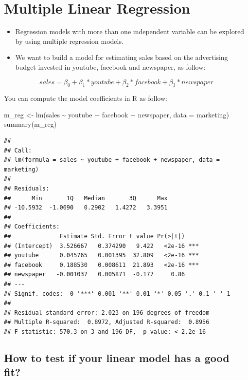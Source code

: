 \documentclass[
]{book}
\newenvironment{Shaded}{\begin{snugshade}}{\end{snugshade}}
\newcommand{\AttributeTok}[1]{\textcolor[rgb]{0.77,0.63,0.00}{#1}}
\newcommand{\FunctionTok}[1]{\textcolor[rgb]{0.00,0.00,0.00}{#1}}
\newcommand{\NormalTok}[1]{#1}
\newcommand{\OtherTok}[1]{\textcolor[rgb]{0.56,0.35,0.01}{#1}}
\newcommand{\SpecialCharTok}[1]{\textcolor[rgb]{0.00,0.00,0.00}{#1}}
\begin{document}
\hypertarget{multiple-linear-regression}{%
\section{Multiple Linear Regression}\label{multiple-linear-regression}}

\begin{itemize}
\item
  Regression models with more than one independent variable can be explored by using multiple regression models.
\item
  We want to build a model for estimating sales based on the advertising budget invested in youtube, facebook and newspaper, as follow:
\end{itemize}

\[sales = \beta_0 + \beta_1*youtube + \beta_2*facebook + \beta_3*newspaper\]

You can compute the model coefficients in R as follow:

\begin{Shaded}
\begin{Highlighting}[]
\NormalTok{m\_reg }\OtherTok{\textless{}{-}} \FunctionTok{lm}\NormalTok{(sales }\SpecialCharTok{\textasciitilde{}}\NormalTok{ youtube }\SpecialCharTok{+}\NormalTok{ facebook }\SpecialCharTok{+}\NormalTok{ newspaper, }\AttributeTok{data =}\NormalTok{ marketing)}
\FunctionTok{summary}\NormalTok{(m\_reg)}
\end{Highlighting}
\end{Shaded}

\begin{verbatim}
## 
## Call:
## lm(formula = sales ~ youtube + facebook + newspaper, data = marketing)
## 
## Residuals:
##      Min       1Q   Median       3Q      Max 
## -10.5932  -1.0690   0.2902   1.4272   3.3951 
## 
## Coefficients:
##              Estimate Std. Error t value Pr(>|t|)    
## (Intercept)  3.526667   0.374290   9.422   <2e-16 ***
## youtube      0.045765   0.001395  32.809   <2e-16 ***
## facebook     0.188530   0.008611  21.893   <2e-16 ***
## newspaper   -0.001037   0.005871  -0.177     0.86    
## ---
## Signif. codes:  0 '***' 0.001 '**' 0.01 '*' 0.05 '.' 0.1 ' ' 1
## 
## Residual standard error: 2.023 on 196 degrees of freedom
## Multiple R-squared:  0.8972, Adjusted R-squared:  0.8956 
## F-statistic: 570.3 on 3 and 196 DF,  p-value: < 2.2e-16
\end{verbatim}

\hypertarget{how-to-test-if-your-linear-model-has-a-good-fit}{%
\subsection{How to test if your linear model has a good fit?}\label{how-to-test-if-your-linear-model-has-a-good-fit}}
\end{document}
